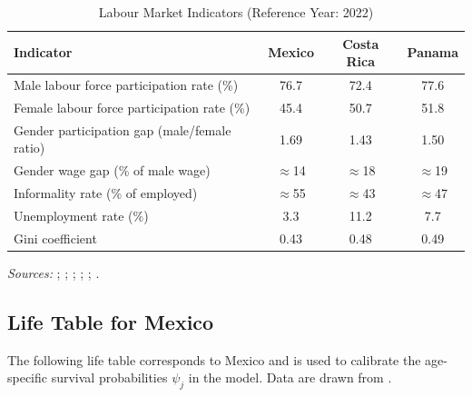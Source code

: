 \documentclass[12pt,a4paper]{article}
\begin{document}
\begin{appendices}
\begin{table}[H]
\centering
\caption{Labour Market Indicators (Reference Year: 2022)}
\label{tab:labour}
\begin{tabular}{lccc}
\hline\hline
\textbf{Indicator} & \textbf{Mexico} & \textbf{Costa Rica} & \textbf{Panama} \\
\hline
Male labour force participation rate (\%)    & 76.7        & 72.4        & 77.6        \\
Female labour force participation rate (\%)  & 45.4        & 50.7        & 51.8        \\
Gender participation gap (male/female ratio) & 1.69        & 1.43        & 1.50        \\
Gender wage gap (\% of male wage)            & $\approx$14 & $\approx$18 & $\approx$19 \\
Informality rate (\% of employed)            & $\approx$55 & $\approx$43 & $\approx$47 \\
Unemployment rate (\%)                       & 3.3         & 11.2        & 7.7         \\
Gini coefficient                             & 0.43        & 0.48        & 0.49        \\
\hline\hline
\end{tabular}
\begin{minipage}{\linewidth}
\smallskip
\footnotesize
\textit{Sources:} \citet{ILOILOSTAT2023}; \citet{ECLACILO2023};
\citet{IMF2023}; \citet{WEFGGR2024}; \citet{WorldBankWDI2024};
\citet{WorldBankPovCalNet2022}.
\end{minipage}
\end{table}

\subsection{Life Table for Mexico}
\label{app:survival}

The following life table corresponds to Mexico and is used to
calibrate the age-specific survival probabilities $\psi_{j}$ in the
model. Data are drawn from \citet{UISP2019}.


\end{appendices}
\end{document}
